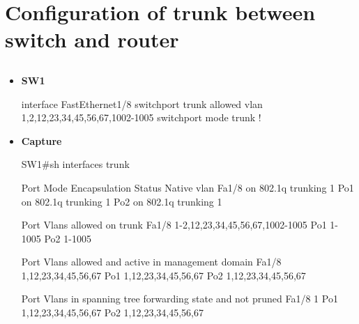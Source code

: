 \documentclass[10pt]{article}
\begin{document}
\section{Configuration of trunk between switch and router}
\subsection{}
\begin{itemize}
\item {\bf SW1}
\begin{verbatim*}
interface FastEthernet1/8
 switchport trunk allowed vlan 1,2,12,23,34,45,56,67,1002-1005
 switchport mode trunk
!
\end{verbatim*}
\item {\bf Capture}
\begin{verbatim*}
SW1#sh interfaces trunk

Port      Mode         Encapsulation  Status        Native vlan
Fa1/8     on           802.1q         trunking      1
Po1       on           802.1q         trunking      1
Po2       on           802.1q         trunking      1

Port      Vlans allowed on trunk
Fa1/8     1-2,12,23,34,45,56,67,1002-1005
Po1       1-1005
Po2       1-1005

Port      Vlans allowed and active in management domain
Fa1/8     1,12,23,34,45,56,67
Po1       1,12,23,34,45,56,67
Po2       1,12,23,34,45,56,67

Port      Vlans in spanning tree forwarding state and not pruned
Fa1/8     1
Po1       1,12,23,34,45,56,67
Po2       1,12,23,34,45,56,67
\end{verbatim*}
\end{itemize}
\end{document}

